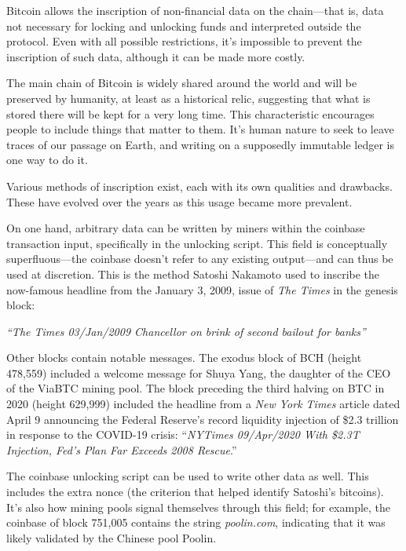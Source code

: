 \documentclass[
  a5paper,
  smalldemyvopaper,10pt,twoside,onecolumn,openright,extrafontsizes,hidelinks]{memoir}
\begin{document}

Bitcoin allows the inscription of non-financial data on the chain---that
is, data not necessary for locking and unlocking funds and interpreted
outside the protocol. Even with all possible restrictions, it's
impossible to prevent the inscription of such data, although it can be
made more costly.

The main chain of Bitcoin is widely shared around the world and will be
preserved by humanity, at least as a historical relic, suggesting that
what is stored there will be kept for a very long time. This
characteristic encourages people to include things that matter to them.
It's human nature to seek to leave traces of our passage on Earth, and
writing on a supposedly immutable ledger is one way to do it.

Various methods of inscription exist, each with its own qualities and
drawbacks. These have evolved over the years as this usage became more
prevalent.

On one hand, arbitrary data can be written by miners within the coinbase
transaction input, specifically in the unlocking script. This field is
conceptually superfluous---the coinbase doesn't refer to any existing
output---and can thus be used at discretion. This is the method Satoshi
Nakamoto used to inscribe the now-famous headline from the January 3,
2009, issue of \emph{The Times} in the genesis block:

\emph{``The Times 03/Jan/2009 Chancellor on brink of second bailout for
banks''}

Other blocks contain notable messages. The exodus block of BCH (height
478,559) included a welcome message for Shuya Yang, the daughter of the
CEO of the ViaBTC mining pool. The block preceding the third halving on
BTC in 2020 (height 629,999) included the headline from a \emph{New York
Times} article dated April 9 announcing the Federal Reserve's record
liquidity injection of \$2.3 trillion in response to the COVID-19
crisis: ``\emph{NYTimes 09/Apr/2020 With \$2.3T Injection, Fed's Plan
Far Exceeds 2008 Rescue}.''

The coinbase unlocking script can be used to write other data as well.
This includes the extra nonce (the criterion that helped identify
Satoshi's bitcoins). It's also how mining pools signal themselves
through this field; for example, the coinbase of block 751,005 contains
the string \emph{poolin.com}, indicating that it was likely validated by
the Chinese pool Poolin.
\end{document}
